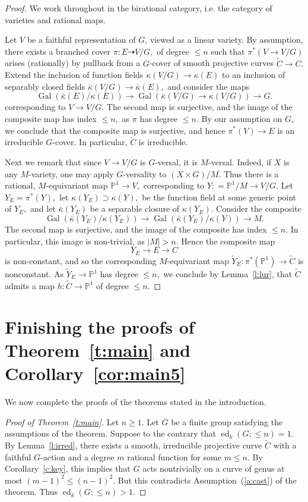 \documentclass[11pt]{amsart}
\theoremstyle{definition}
\numberwithin{equation}{section}
\newcommand{\Pb}{\mathbb{P}}
\newcommand{\tC}{\widetilde{C}}
\DeclareMathOperator{\ed}{ed}
\DeclareMathOperator{\Gal}{Gal}
\begin{document}
\begin{proof}  We work throughout in the birational category, i.e. the category of varieties and rational maps.  

Let $V$ be a faithful representation of $G$, viewed as a linear variety. 
By assumption, there exists a branched cover $\pi\colon E\dashrightarrow V/G,$ of degree $\leq n$ 
such that $\pi^*(V \rightarrow V/G)$ arises (rationally) by pullback from a $G$-cover of smooth projective curves  
$\tilde C \rightarrow C.$
Extend the inclusion of function fields $\kappa(V/G) \rightarrow \kappa(E)$ to an inclusion of separably closed fields 
$\bar \kappa(V/G) \rightarrow \bar \kappa(E),$ and consider the maps 
$$ \Gal(\bar \kappa(E)/ \kappa(E)) \rightarrow \Gal(\bar\kappa(V/G) \rightarrow \kappa(V/G)) \rightarrow G.$$ 
corresponding to $V \rightarrow V/G.$ The second map is surjective, and the image of the composite map 
has index $\leq n,$ as $\pi$ has degree $\leq n.$ By our assumption on $G$, we conclude that the composite map is surjective, and hence $\pi^*(V) \rightarrow E$ 
is an irreducible $G$-cover. In particular, $\tilde C$ is irreducible.

Next we remark that since $V \rightarrow V/G$ is $G$-versal, it is $M$-versal. 
Indeed, if $X$ is any $M$-variety, one may apply $G$-versality to $(X \times G)/M.$ 
Thus there is a rational, $M$-equivariant map $\Pb^1 \rightarrow V,$ corresponding to 
$Y: = \Pb^1/M \rightarrow V/G.$ Let $Y_E = \pi^*(Y),$ 
let $\kappa(Y_E) \supset \kappa(Y),$ be the function field at some generic point of $Y_E,$ 
and let $\bar \kappa(Y_E)$ be a separable closure of $\kappa(Y_E).$ Consider the composite 
$$ \Gal(\bar \kappa(Y_E)/ \kappa(Y_E)) \rightarrow \Gal(\bar \kappa(Y_E)/ \kappa(Y)) \rightarrow M.$$ 
The second map is surjective, and the image of the composite has index $\leq n.$ In particular, this image is 
non-trivial, as $|M| > n.$ Hence the composite map 
$$ Y_E \rightarrow E \rightarrow C $$
is non-constant, and so the corresponding $M$-equivariant map $\tilde Y_E : \pi^*(\Pb^1) \rightarrow \tilde C$ 
is nonconstant. As $\tilde Y_E \rightarrow \Pb^1$ has degree $\leq n,$ 
we conclude by Lemma~\ref{l:lur}, that $\tC$ admits a map $h\colon \tC\to\Pb^1$ of degree $\le n$.
	\end{proof}

\section{Finishing the proofs of Theorem~\ref{t:main} and Corollary~\ref{cor:main5}}\label{s:proofs}
We now complete the proofs of the theorems stated in the introduction.
\begin{proof}[Proof of Theorem~\ref{t:main}]
Let $n\ge 1$.  Let $G$ be a finite group satisfying the assumptions of the theorem.  Suppose to the contrary that $\ed_k(G;\le n)=1$. By Lemma~\ref{l:irred}, there exists a smooth, irreducible projective curve $\tC$ with a faithful $G$-action and a degree $m$ rational function for some $m\le n$. By Corollary~\ref{c:key}, this implies that $G$ acts nontrivially on a curve of genus at most $(m-1)^2\le (n-1)^2$. But this contradicts Assumption~(\ref{a:cast}) of the theorem.  Thus $\ed_k(G;\le n)>1$.
\end{proof}
\end{document}
